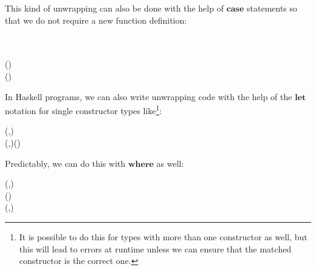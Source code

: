 \documentclass[paper=A4,twoside=true,openright,parskip=full,chapterprefix=true,headings=normal,bibliography=totoc,listof=totoc,titlepage=on,captions=tableabove,draft=false,british]{scrreprt}%
\begin{document}
This kind of unwrapping can also be done with the help of \ensuremath{\mathbf{case}}
statements so that we do not require a new function definition:


\begin{hscode}\SaveRestoreHook
{}%
%
%
\>[B]{}\mathbin{::}\;\to {}\<[E]%
\\
\>[B]{}\;\mathrel{=}\;\;\<[E]%
\\
\>[B]{}\<[5]%
\>[5]{}(\;)\to {}\<[E]%
\\
\>[B]{}\<[5]%
\>[5]{}(\;)\to {}\<[E]%
\ColumnHook
\end{hscode}\resethooks
\vspace{-2\baselineskip}

In Haskell programs, we can also write unwrapping code with the help of
the \ensuremath{\mathbf{let}} notation for single constructor types like\footnote{It is
  possible to do this for types with more than one constructor as well,
  but this will lead to errors at runtime unless we can ensure that the
  matched constructor is the correct one.}:


\begin{hscode}\SaveRestoreHook
{}%
%
\>[B]{}\mathbin{::}(,)\to {}\<[E]%
\\
\>[B]{}\;\mathrel{=}\;(,)\mathrel{=}\;\;\;(\mathbin{*}\mathbin{+}\mathbin{*}){}\<[E]%
\ColumnHook
\end{hscode}\resethooks
\vspace{-2\baselineskip}

Predictably, we can do this with \ensuremath{\mathbf{where}} as well:


\begin{hscode}\SaveRestoreHook
{}%
%
%
\>[B]{}\mathbin{::}(,)\to {}\<[E]%
\\
\>[B]{}\;\mathrel{=}\;(\mathbin{*}\mathbin{+}\mathbin{*}){}\<[E]%
\\
\>[B]{}\<[5]%
\>[5]{}\;(,)\mathrel{=}\<[E]%
\ColumnHook
\end{hscode}\resethooks
\vspace{-2\baselineskip}
\end{document}
